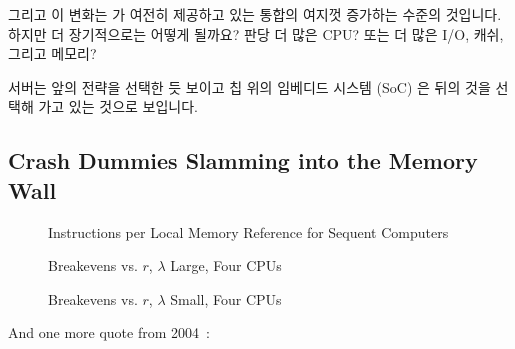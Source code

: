 그리고 이 변화는  가 여전히 제공하고 있는 통합의 여지껏
증가하는 수준의 것입니다.
하지만 더 장기적으로는 어떻게 될까요?
판당 더 많은 CPU?
또는 더 많은 I/O, 캐쉬, 그리고 메모리?

서버는 앞의 전략을 선택한 듯 보이고 칩 위의 임베디드 시스템 (SoC) 은 뒤의 것을
선택해 가고 있는 것으로 보입니다.

\subsection{Crash Dummies Slamming into the Memory Wall}
\label{sec:future:Crash Dummies Slamming into the Memory Wall}

\begin{figure}[tbp]
\centering
\epsfxsize=3in
\caption{Instructions per Local Memory Reference for Sequent Computers}
\label{fig:future:Instructions per Local Memory Reference for Sequent Computers}
\end{figure}

\begin{figure}[htbp]
\centering
\epsfxsize=3in
\caption{Breakevens vs. $r$, $\lambda$ Large, Four CPUs}
\label{fig:future:Breakevens vs. r; lambda Large; Four CPUs}
\end{figure}

\begin{figure}[htbp]
\centering
\epsfxsize=3in
\caption{Breakevens vs. $r$, $\lambda$ Small, Four CPUs}
\label{fig:future:Breakevens vs. r; Worst-Case lambda; Four CPUs}
\end{figure}

And one more quote from 2004~\cite{PaulEdwardMcKenneyPhD}:

